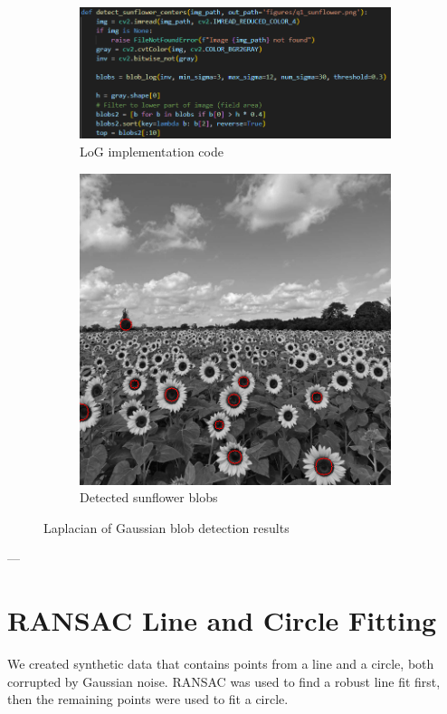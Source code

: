 \documentclass[12pt,a4paper]{article}
\begin{document}
\begin{figure}[H]\centering
\begin{subfigure}{0.45\textwidth}
\includegraphics[width=\linewidth]{images/q1_code.png}
\caption{LoG implementation code}
\end{subfigure}\hfill
\begin{subfigure}{0.45\textwidth}
\includegraphics[width=\linewidth]{figures/q1_sunflower.png}
\caption{Detected sunflower blobs}
\end{subfigure}
\caption{Laplacian of Gaussian blob detection results}
\end{figure}

---

\section{RANSAC Line and Circle Fitting}
We created synthetic data that contains points from a line and a circle, both corrupted by Gaussian noise. RANSAC was used to find a robust line fit first, then the remaining points were used to fit a circle.
\end{document}
